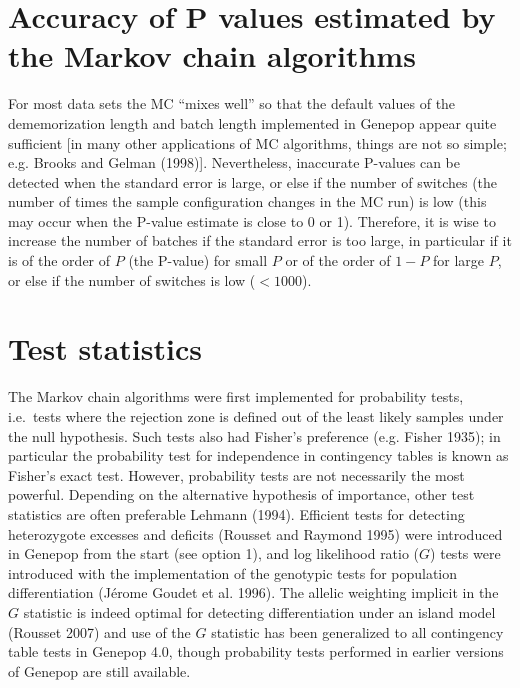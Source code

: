 \documentclass[
  12pt,
]{book}
\begin{document}
\hypertarget{accuracy-of-p-values-estimated-by-the-markov-chain-algorithms}{%
\section{Accuracy of P values estimated by the Markov chain algorithms}\label{accuracy-of-p-values-estimated-by-the-markov-chain-algorithms}}

For most data sets the MC ``mixes well'' so that the default values of the dememorization length and batch length implemented in Genepop appear quite sufficient {[}in many other applications of MC algorithms, things are not so simple; e.g. Brooks and Gelman (1998){]}. Nevertheless, inaccurate P-values can be detected when the standard error is large, or else if the number of switches (the number of times the sample configuration changes in the MC run) is low (this may occur when the P-value estimate is close to 0 or 1). Therefore, it is wise to increase the number of batches if the standard error is too large, in particular if it is of the order of \(P\) (the P-value) for small \(P\) or of the order of \(1-P\) for large \(P\), or else if the number of switches is low (\(<1000\)).

\hypertarget{test-statistics}{%
\section{Test statistics}\label{test-statistics}}

The Markov chain algorithms were first implemented for probability tests, i.e.~tests where the rejection zone is defined out of the least likely samples under the null hypothesis. Such tests also had Fisher's preference (e.g. Fisher 1935); in particular the probability test for independence in contingency tables is known as Fisher's exact test. However, probability tests are not necessarily the most powerful. Depending on the alternative hypothesis of importance, other test statistics are often preferable Lehmann (1994). Efficient tests for detecting heterozygote excesses and deficits (Rousset and Raymond 1995) were introduced in Genepop from the start (see option 1), and log likelihood ratio (\(G\)) tests were introduced with the implementation of the genotypic tests for population differentiation (Jérome Goudet et al. 1996). The allelic weighting implicit in the \(G\) statistic is indeed optimal for detecting differentiation under an island model (Rousset 2007) and use of the \(G\) statistic has been generalized to all contingency table tests in Genepop 4.0, though probability tests performed in earlier versions of Genepop are still available.
\end{document}

